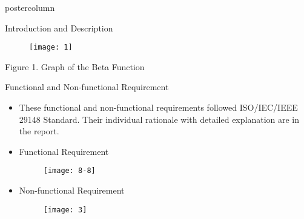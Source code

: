 \documentclass[final,hyperref={pdfpagelabels=false}]{beamer}
\begin{document}
\begin{frame}
\begin{columns}
\begin{column}{.49\textwidth}
\begin{beamercolorbox}[center,wd=\textwidth]{postercolumn}
\begin{minipage}[T]{.95\textwidth}
{\begin{block}{Introduction and Description}
\begin{itemize}
\begin{itemize}
\begin{figure}[h]
\begin{center}
\texttt{[image: 1]} 
\end{center}
\end{figure}

            Figure 1. Graph of the Beta Function   
                
                \end{itemize}
              \end{itemize}              
            \end{block}
            \vfill
           
             
            \begin{block}{Functional and Non-functional Requirement}
              \begin{itemize}      
  \item   These functional and non-functional requirements followed ISO/IEC/IEEE 29148 Standard. Their individual rationale with detailed explanation are in the report. 
            
             
              \item Functional Requirement
                            
\begin{figure}[h]
\begin{center}
\texttt{[image: 8-8]} 
\end{center}
\end{figure}
    
     \item Non-functional Requirement
                
              \begin{figure}[h]
\begin{center}
\texttt{[image: 3]} 
\end{center}
\end{figure} 
                \begin{itemize}
    
                \end{itemize}
               \end{itemize}
            \end{block}
            \vfill
            
           
           
           
}
\end{minipage}
\end{beamercolorbox}
\end{column}
\end{columns}
\end{frame}
\end{document}
